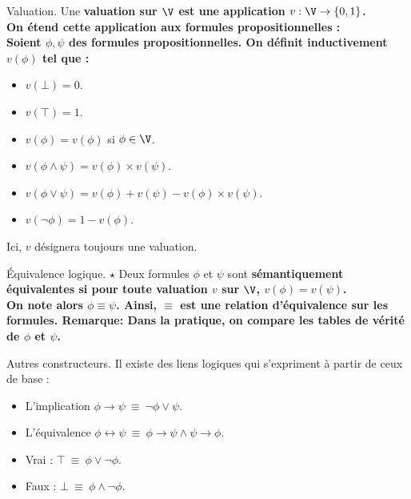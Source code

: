 \documentclass[french, 11pt]{article}
\begin{document}
\begin{defi}{Valuation.}{}
    Une \bf{valuation} sur $\V$ est une application $v:\V\to\{0,1\}$.\\
    On étend cette application aux formules propositionnelles :\\
    Soient $\phi,\psi$ des formules propositionnelles. On définit inductivement $v(\phi)$ tel que :
    \begin{itemize}[topsep=0pt,itemsep=-0.9 ex]
        \item $v(\bot)=0$.
        \item $v(\top)=1$.
        \item $v(\phi)=v(\phi)$ si $\phi\in\V$.
        \item $v(\phi\land\psi)=v(\phi)\times v(\psi)$.
        \item $v(\phi\lor\psi)=v(\phi) + v(\psi) - v(\phi)\times v(\psi)$.
        \item $v(\lnot\phi)=1-v(\phi)$.
    \end{itemize}
    Ici, $v$ désignera toujours une valuation.
\end{defi}

\begin{defi}{Équivalence logique. $\star$}{}
    Deux formules $\phi$ et $\psi$ sont \bf{sémantiquement équivalentes} si pour toute valuation $v$ sur $\V$, $v(\phi)=v(\psi)$.\\
    On note alors $\phi\equiv\psi$. Ainsi, $\equiv$ est une relation d'équivalence sur les formules.\n
    \bf{Remarque:} Dans la pratique, on compare les tables de vérité de $\phi$ et $\psi$.
\end{defi}

\begin{defi}{Autres constructeurs.}{}
    Il existe des liens logiques qui s'expriment à partir de ceux de base :
    \begin{itemize}[topsep=0pt,itemsep=-0.9 ex]
        \item L'implication $\phi \rightarrow \psi ~ \equiv ~ \lnot\phi\lor\psi$.
        \item L'équivalence $\phi \leftrightarrow \psi ~ \equiv ~ \phi\rightarrow\psi\land\psi\rightarrow\phi$.
        \item Vrai : $\top ~ \equiv ~ \phi\lor\lnot\phi$.
        \item Faux : $\bot ~ \equiv ~ \phi\land\lnot\phi$.
    \end{itemize}
\end{defi}

\pagebreak 
\end{document}
